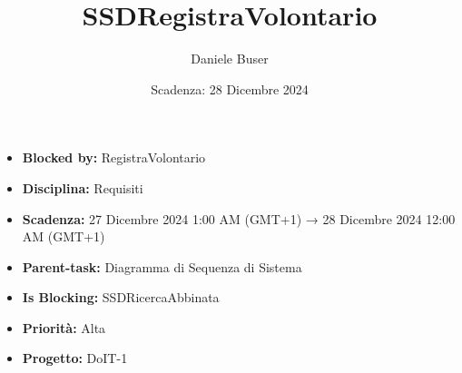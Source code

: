 \title{SSDRegistraVolontario}
\author{Daniele Buser}
\date{Scadenza: 28 Dicembre 2024}

\maketitle

\begin{itemize}
    \item \textbf{Blocked by:} RegistraVolontario
    \item \textbf{Disciplina:} Requisiti
    \item \textbf{Scadenza:} 27 Dicembre 2024 1:00 AM (GMT+1) → 28 Dicembre 2024 12:00 AM (GMT+1)
    \item \textbf{Parent-task:} Diagramma di Sequenza di Sistema
    \item \textbf{Is Blocking:} SSDRicercaAbbinata
    \item \textbf{Priorità:} Alta
    \item \textbf{Progetto:} DoIT-1
\end{itemize}